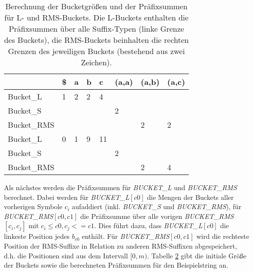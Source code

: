 \begin{table}
\begin{table}[]
\begin{tabular}{|l|l|l|l|l|l|l|l|}
\hline
            & \$                        & a                         & b                         & c                          & (a,a) & (a,b)                     & (a,c)                     \\ \hline
Bucket\_L   & 1                         & 2                         & 2                         & 4                          &       &                           &                           \\ \hline
Bucket\_S   &                           &                           &                           &                            & 2     &                           &                           \\ \hline
Bucket\_RMS &                           &                           &                           &                            &       & 2                         & 2                         \\ \hline
Bucket\_L   & \cellcolor[HTML]{34CDF9}0 & \cellcolor[HTML]{34CDF9}1 & \cellcolor[HTML]{34CDF9}9 & \cellcolor[HTML]{34CDF9}11 &       &                           &                           \\ \hline
Bucket\_S   &                           &                           &                           &                            & 2     &                           &                           \\ \hline
Bucket\_RMS &                           &                           &                           &                            &       & \cellcolor[HTML]{32CB00}2 & \cellcolor[HTML]{32CB00}4 \\ \hline
\end{tabular}
	\caption{Berechnung der Bucketgrößen und der Präfixsummen für L- und RMS-Buckets. Die L-Buckets enthalten die Präfixsummen über alle Suffix-Typen (linke Grenze des Buckets), die RMS-Buckets beinhalten die rechten Grenzen des jeweiligen Buckets (bestehend aus zwei Zeichen).}
	\label{table:prefixsum}
\end{table}


Als nächstes werden die Präfixsummen für \textit{BUCK\-ET\_L} und \textit{BUCK\-ET\_RMS} berechnet. Dabei werden für \textit{BUCKET\_L}$[c0]$ die Mengen der Buckets aller vorherigen Symbole $c_i$ aufaddiert (inkl. \textit{BUCKET\_S} und \textit{BUCKET\_RMS}), für \textit{BUCKET\_RMS}$[c0,c1]$ die Präfixsumme über alle vorigen \textit{BUCK\-ET\_RMS}$[c_i,c_j]$  mit $c_i \leq c0, c_j <= c1$. Dies führt dazu, dass \textit{BUCKET\_L$[c0]$} die linkeste Position jedes $b_{c0}$ enthält. Für \textit{BUCKET\_RMS$[c0,c1]$} wird die rechteste Position der RMS-Suffixe in Relation zu anderen RMS-Suffixen abgespeichert, d.h. die Positionen sind aus dem Intervall $[0,m)$. Tabelle \ref{table:prefixsum} gibt die initiale Größe der Buckets sowie die berechneten Präfixsummen für den Beispielstring an.


\end{table}
